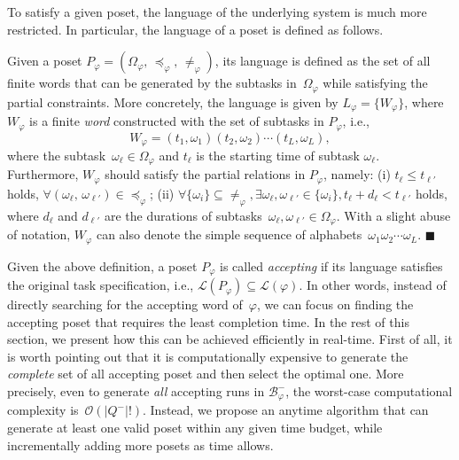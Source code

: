 To satisfy a given poset, the language of the underlying system is
much more restricted.
In particular, the language of a poset is defined as follows.

\begin{definition}\label{def:language-poset}
Given a poset $P_\varphi=(\Omega_{\varphi}, \, \preceq_{\varphi}, \, \neq_{\varphi})$,
its language is defined as the set of all finite words
that can be generated by the subtasks in~$\Omega_{\varphi}$
while satisfying the partial constraints.
More concretely, the language is given by
$L_\varphi=\{W_{\varphi}\}$, where $W_{\varphi}$ is a finite
\emph{word} constructed with the set of subtasks in $P_\varphi$, i.e.,
\begin{equation}\label{eq:poset-language}
W_{\varphi}=(t_1,\omega_1) (t_2,\omega_2)\cdots (t_L,\omega_L),
\end{equation}
where the subtask~$\omega_\ell \in \Omega_\varphi$ and
$t_\ell$ is the starting time of subtask $\omega_\ell$.
Furthermore, $W_{\varphi}$ should satisfy the partial relations in $P_\varphi$, namely:
(i) $t_\ell \leq t_{\ell'}$ holds,
$\forall (\omega_\ell,\,\omega_{\ell'})\in \preceq_{\varphi}$;
(ii) $\forall \{\omega_{i}\}\subseteq \neq_{\varphi},
\exists\omega_{\ell},\omega_{\ell'}\in\{\omega_{i}\}, t_\ell + d_\ell <  t_{\ell'}$ holds,
where $d_\ell$ and $d_{\ell'}$ are the durations of
subtasks~$\omega_\ell, \omega_{\ell'} \in \Omega_{\varphi}$.
With a slight abuse of notation, $W_\varphi$ can also denote the
simple sequence of alphabets~$\omega_1\omega_2\cdots \omega_L$.
\hfill $\blacksquare$
\end{definition}

Given the above definition, a poset $P_\varphi$ is called \emph{accepting}
if its language satisfies the original task specification, i.e.,
$\mathcal{L}(P_\varphi)\subseteq \mathcal{L}(\varphi)$.
In other words, instead of directly searching for the accepting word of~$\varphi$,
we can focus on finding the accepting poset that
requires the least completion time.
In the rest of this section, we present how this can be achieved efficiently
in real-time.
First of all, it is worth pointing out that it is computationally expensive to
generate the \emph{complete} set of all accepting poset
and then select the optimal one.
More precisely, even to generate \emph{all} accepting runs in $\mathcal{B}_{\varphi}^-$,
the worst-case computational complexity is~$\mathcal{O}(|Q^-|!)$.
Instead, we propose an anytime algorithm that can generate at least one
valid poset within any given time budget,
while incrementally adding more posets as time allows.


